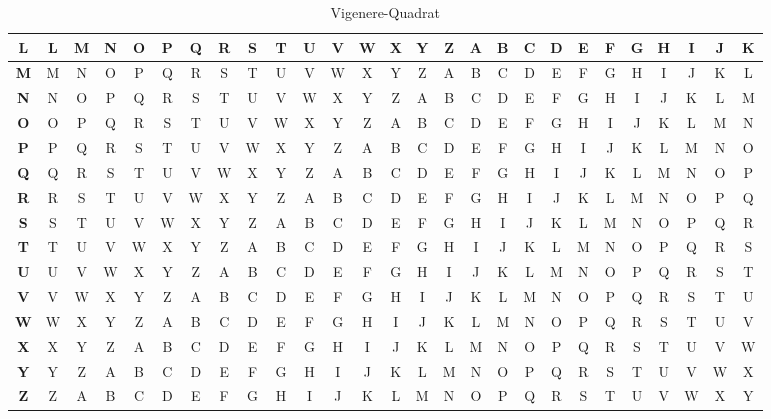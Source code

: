 \begin{table}[H]
\begin{tabular}{|c||c|c|c|c|c|c|c|c|c|c|c|c|c|c|c|c|c|c|c|c|c|c|c|c|c|c|}
\textbf{L} & L & M & N & O & P & Q & R & S & T & U & V & W & X & Y & Z & A & B & C & D & E & F & G & H & I & J & K \\ \hline
\textbf{M} & M & N & O & P & Q & R & S & T & U & V & W & X & Y & Z & A & B & C & D & E & F & G & H & I & J & K & L \\ \hline
\textbf{N} & N & O & P & Q & R & S & T & U & V & W & X & Y & Z & A & B & C & D & E & F & G & H & I & J & K & L & M \\ \hline
\textbf{O} & O & P & Q & R & S & T & U & V & W & X & Y & Z & A & B & C & D & E & F & G & H & I & J & K & L & M & N \\ \hline
\textbf{P} & P & Q & R & S & T & U & V & W & X & Y & Z & A & B & C & D & E & F & G & H & I & J & K & L & M & N & O \\ \hline
\textbf{Q} & Q & R & S & T & U & V & W & X & Y & Z & A & B & C & D & E & F & G & H & I & J & K & L & M & N & O & P \\ \hline
\textbf{R} & R & S & T & U & V & W & X & Y & Z & A & B & C & D & E & F & G & H & I & J & K & L & M & N & O & P & Q \\ \hline
\textbf{S} & S & T & U & V & W & X & Y & Z & A & B & C & D & E & F & G & H & I & J & K & L & M & N & O & P & Q & R \\ \hline
\textbf{T} & T & U & V & W & X & Y & Z & A & B & C & D & E & F & G & H & I & J & K & L & M & N & O & P & Q & R & S \\ \hline
\textbf{U} & U & V & W & X & Y & Z & A & B & C & D & E & F & G & H & I & J & K & L & M & N & O & P & Q & R & S & T \\ \hline
\textbf{V} & V & W & X & Y & Z & A & B & C & D & E & F & G & H & I & J & K & L & M & N & O & P & Q & R & S & T & U \\ \hline
\textbf{W} & W & X & Y & Z & A & B & C & D & E & F & G & H & I & J & K & L & M & N & O & P & Q & R & S & T & U & V \\ \hline
\textbf{X} & X & Y & Z & A & B & C & D & E & F & G & H & I & J & K & L & M & N & O & P & Q & R & S & T & U & V & W \\ \hline
\textbf{Y} & Y & Z & A & B & C & D & E & F & G & H & I & J & K & L & M & N & O & P & Q & R & S & T & U & V & W & X \\ \hline
\textbf{Z} & Z & A & B & C & D & E & F & G & H & I & J & K & L & M & N & O & P & Q & R & S & T & U & V & W & X & Y \\ \hline
                    	\end{tabular}
                    	\caption{Vigenere-Quadrat}
                    \end{table}
                
